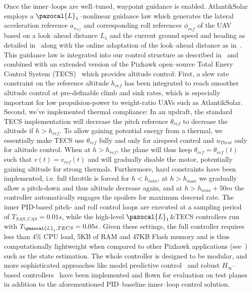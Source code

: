 Once the inner--loops are well--tuned, waypoint guidance is enabled. AtlantikSolar employs a $\pazocal{L}_1$--nonlinear guidance law which generates the lateral acceleration reference $a_{s_{ref}}$ and corresponding roll references $\phi_{ref}$ of the UAV based on a look--ahead distance ${L}_1$ and the current ground speed and heading as detailed in~\cite{HOW_L1nav} along with the online adaptation of the look--ahead distance as in~\cite{park2007performance}. This guidance law is integrated into our control structure as described in~\cite{Oettershagen_MED14_L1MPC} and combined with an extended version of the Pixhawk open--source Total Enery Control System (TECS)~\cite{PixhawkWebsite} which provides altitude control: First, a slew rate constraint on the reference altitude $h_{ref}$ has been integrated to reach smoother altitude control at pre-definable climb and sink rates, which is especially important for low propulsion-power to weight-ratio UAVs such as AtlantikSolar. Second, we've implemented thermal compliance: In an updraft, the standard TECS implementation will decrease the pitch reference $\theta_{ref}$ to decrease the altitude if $h>h_{ref}$. To allow gaining potential energy from a thermal, we essentially make TECS use $\theta_{ref}$ fully and only for airspeed control and $u_{Throt}$ only for altitude control. When at $h>h_{ref}$, the plane will thus keep $\theta_{ref}=\theta_{ref}(t)$  such that $v(t)=v_{ref}(t)$ and will gradually disable the motor, potentially gaining altitude for strong thermals. Furthermore, hard constraints have been implemented, i.e. full throttle is forced for $h<h_{min}$, at $h>h_{max}$ we gradually allow a pitch-down and thus altitude decrease again, and at $h>h_{max}+50m$ the controller automatically engages the spoilers for maximum descend rate. The inner PID-based pitch- and roll control loops are executed at a sampling period of $T_{SAS,CAS}=0.01s$, while the high-level $\pazocal{L}_1$\&TECS controllers run with $T_{\pazocal{L}_1,TECS}=0.05s$. Given these settings, the full controller requires less than 4\% CPU load, 5KB of RAM and 47KB Flash memory and is thus computationally lightweight when compared to other Pixhawk applications (see~\cite{Oettershagen_MED14_L1MPC}) such as the state estimation. The whole controller is designed to be modular, and more sophisticated approaches like model predictive control~\cite{Oettershagen_MED14_L1MPC} and robust $H_\infty$--based controllers~\cite{Mosimann_FT} have been implemented and flown for evaluation on test planes in addition to the aforementioned PID--baseline inner--loop control solution. 
